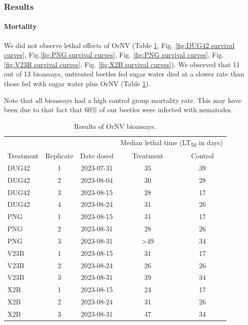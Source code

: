 \documentclass[12pt,letterpaper,english,bibliography=totocnumbered, abstract=on]{scrartcl}
\begin{document}
\clearpage
\subsubsection{Results}

\paragraph{Mortality}

We did not observe lethal effects of OrNV (Table \ref{bioassay_summary}, Fig. \ref{fig:DUG42 survival curves}, Fig.\ref{fig:PNG survival curves}, Fig. \ref{fig:PNG survival curves}, Fig. \ref{fig:V23B survival curves}, Fig. \ref{fig:X2B survival curves}). We observed that 11 out of 13 bioassays, untreated beetles fed sugar water died at a slower rate than those fed with sugar water plus OrNV (Table \ref{bioassay_summary}). 

Note that all bioassays had a high control group mortality rate. This may have been due to that fact that 60\% of our beetles were infected with nematodes.

\begin{table}[H]
	\centering
	\caption{Results of OrNV bioassays.}
	\label{bioassay_summary}

	\begin{tabular}{lcccc}
		\hline
		&&&\multicolumn{2}{c}{Median lethal time (LT\textsubscript{50} in days)} \\
		\cline{4-5}
		Treatment & Replicate & Date dosed & Treatment & Control \\
		\hline
		DUG42&1&2023-07-31&35&39\\
		DUG42&2&2023-08-04&30&28\\
		DUG42&3&2023-08-15&28&17\\
		DUG42&4&2023-08-24&31&26\\
		\hline
		PNG&1&2023-08-15&31&17\\
		PNG&2&2023-08-31&28&26\\
		PNG&3&2023-08-31&>49&34\\
		\hline
		V23B&1&2023-08-15&31&17\\
		V23B&2&2023-08-24&26&26\\
		V23B&3&2023-08-31&39&34\\
		\hline
		X2B&1&2023-08-15&24&17\\
		X2B&2&2023-08-24&31&26\\
		X2B&3&2023-08-31&47&34\\
		\hline
	\end{tabular}
	
\end{table}
\end{document}
